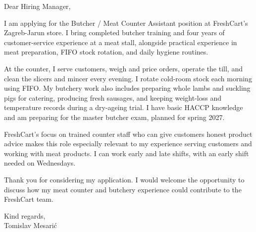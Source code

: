 \documentclass[11pt,a4paper]{article}
\begin{document}
Dear Hiring Manager,

I am applying for the Butcher / Meat Counter Assistant position at FreshCart’s Zagreb-Jarun store. I bring completed butcher training and four years of customer-service experience at a meat stall, alongside practical experience in meat preparation, FIFO stock rotation, and daily hygiene routines.

At the counter, I serve customers, weigh and price orders, operate the till, and clean the slicers and mincer every evening. I rotate cold-room stock each morning using FIFO. My butchery work also includes preparing whole lambs and suckling pigs for catering, producing fresh sausages, and keeping weight-loss and temperature records during a dry-ageing trial. I have basic HACCP knowledge and am preparing for the master butcher exam, planned for spring 2027.

FreshCart’s focus on trained counter staff who can give customers honest product advice makes this role especially relevant to my experience serving customers and working with meat products. I can work early and late shifts, with an early shift needed on Wednesdays.

Thank you for considering my application. I would welcome the opportunity to discuss how my meat counter and butchery experience could contribute to the FreshCart team.

Kind regards,\\
Tomislav Mesarić
\end{document}
